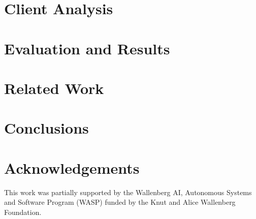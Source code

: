 \section{Client Analysis}
\label{sec:analysis}


\section{Evaluation and Results}
\label{sec:evaluation_results}


\section{Related Work}
\label{sec:related_works}


\section{Conclusions}
\label{sec:conclusions}



\section*{Acknowledgements}

This work was partially supported by the Wallenberg AI, Autonomous Systems and Software Program (WASP) funded by the Knut and Alice Wallenberg Foundation.

{\raggedright
\printbibliography[segment=\therefsegment,heading=subbibliography]
}
